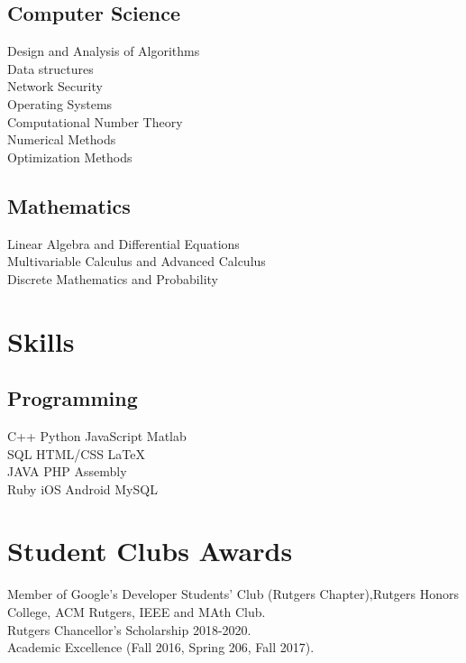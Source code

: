 \documentclass[]{deedy-resume-openfont}
\begin{document}
\begin{minipage}[t]{0.33\textwidth}
\subsection{Computer Science}
Design and Analysis of Algorithms\\
Data structures\\
Network Security\\
Operating Systems\\
Computational Number Theory\\
Numerical Methods\\
Optimization Methods\\
\subsection{Mathematics}
Linear Algebra and Differential Equations\\
Multivariable Calculus and Advanced Calculus\\
Discrete Mathematics and Probability\\
\sectionsep


\section{Skills}
\subsection{Programming}
C++ \textbullet{}   Python \textbullet{} JavaScript \textbullet{} Matlab \\
SQL \textbullet{}  HTML/CSS \textbullet{} \LaTeX\ \\ 
JAVA \textbullet{}  PHP \textbullet{}  \textbullet{} Assembly \\
Ruby \textbullet{} iOS \textbullet{} Android \textbullet{} MySQL
\sectionsep

\section{Student Clubs Awards}
Member of Google’s Developer Students’ Club (Rutgers Chapter),Rutgers Honors College, ACM Rutgers, IEEE and MAth Club.\\
Rutgers Chancellor’s Scholarship 2018-2020.\\
Academic Excellence (Fall 2016, Spring 206, Fall 2017).
\sectionsep

%
%

\end{minipage} 
\end{document}
